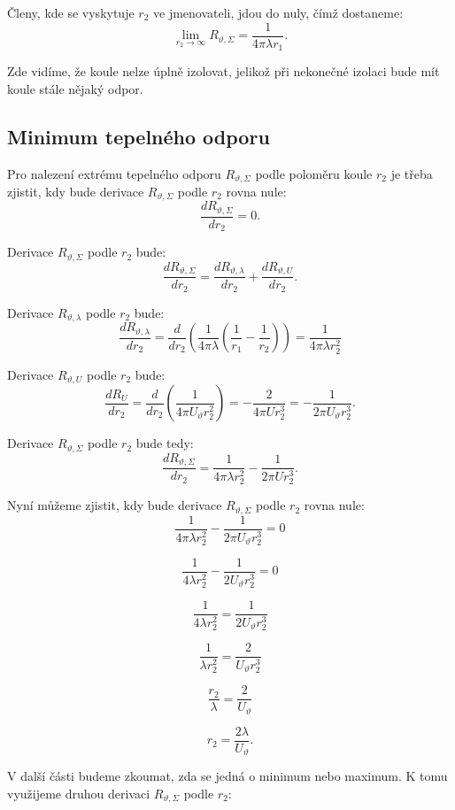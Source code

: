 \documentclass{article}
\begin{document}
Členy, kde se vyskytuje $r_2$ ve jmenovateli, jdou do nuly, čímž dostaneme:
$$
    \lim_{r_2 \to \infty} R_{\vartheta,\Sigma} = \frac{1}{4 \pi \lambda r_1}.
$$

Zde vidíme, že koule nelze úplně izolovat, jelikož při nekonečné izolaci bude mít koule stále nějaký odpor.


\subsection{Minimum tepelného odporu}

Pro nalezení extrému tepelného odporu $R_{\vartheta,\Sigma}$ podle poloměru koule $r_2$ je třeba zjistit, kdy bude derivace $R_{\vartheta,\Sigma}$ podle $r_2$ rovna nule:
$$
    \frac{dR_{\vartheta,\Sigma}}{dr_2} = 0.
$$

Derivace $R_{\vartheta,\Sigma}$ podle $r_2$ bude:
$$
    \frac{dR_{\vartheta,\Sigma}}{dr_2} = \frac{dR_{\vartheta,\lambda}}{dr_2} + \frac{dR_{\vartheta,U}}{dr_2}.
$$

Derivace $R_{\vartheta,\lambda}$ podle $r_2$ bude:
$$
    \frac{dR_{\vartheta,\lambda}}{dr_2} = \frac{d}{dr_2} \left( \frac{1}{4 \pi \lambda} \left( \frac{1}{r_1} - \frac{1}{r_2} \right) \right) = \frac{1}{4 \pi \lambda r_2^2}
$$

Derivace $R_{\vartheta,U}$ podle $r_2$ bude:
$$
    \frac{dR_{U}}{dr_2} = \frac{d}{dr_2} \left( \frac{1}{4 \pi U_{\vartheta} r_2^2} \right) = -\frac{2}{4 \pi U r_2^3} = -\frac{1}{2 \pi U_{\vartheta} r_2^3}.
$$

Derivace $R_{\vartheta,\Sigma}$ podle $r_2$ bude tedy:
$$
    \frac{dR_{\vartheta,\Sigma}}{dr_2} = \frac{1}{4 \pi \lambda r_2^2} - \frac{1}{2 \pi U r_2^3}.
$$

Nyní můžeme zjistit, kdy bude derivace $R_{\vartheta,\Sigma}$ podle $r_2$ rovna nule:
$$
    \frac{1}{4 \pi \lambda r_2^2} - \frac{1}{2 \pi U_{\vartheta} r_2^3} = 0
$$

$$
    \frac{1}{4 \lambda r_2^2} - \frac{1}{2 U_{\vartheta} r_2^3} = 0
$$

$$
    \frac{1}{4 \lambda r_2^2} = \frac{1}{2 U_{\vartheta} r_2^3}
$$

$$
    \frac{1}{\lambda r_2^2} = \frac{2}{U_{\vartheta} r_2^3}
$$

$$
    \frac{r_2}{\lambda} = \frac{2}{U_{\vartheta}}
$$

$$
    r_2 = \frac{2 \lambda}{U_{\vartheta}}.
$$

V další části budeme zkoumat, zda se jedná o minimum nebo maximum. K tomu využijeme druhou derivaci $R_{\vartheta,\Sigma}$ podle $r_2$:
\end{document}
